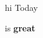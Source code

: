 \documentclass{article}
\begin{document}
%



hi Today

\newif\ifismonday

\ismondayfalse

\ifismonday
  sucks!
\else
  is \textbf{great}
\fi


\end{document}
